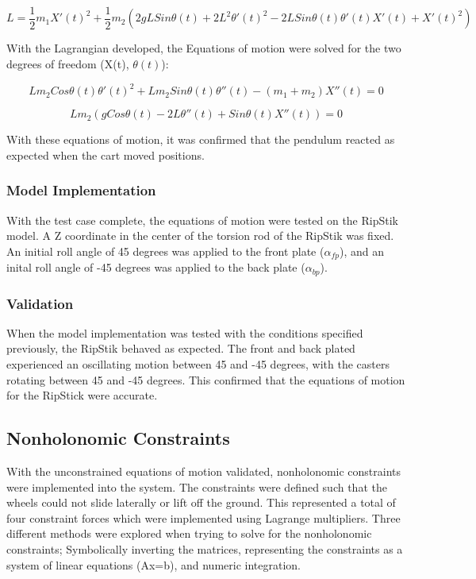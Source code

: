 \documentclass[12pt,letterpaper]{article}
\begin{document}
\begin{equation}
\label{eq:CartLagrange}
L = \frac{1}{2}m_{1}X'(t)^2+\frac{1}{2}m_{2}(2gLSin\theta(t)+2L^2\theta'(t)^2-2LSin\theta(t)\theta'(t)X'(t)+X'(t)^2) 
\end{equation}

With the Lagrangian developed, the Equations of motion were solved for the two degrees of freedom (X(t), $\theta(t)$):

\begin{equation}
Lm_{2}Cos\theta(t)\theta'(t)^2+Lm_{2}Sin\theta(t)\theta''(t)-(m_{1}+m_{2})X''(t) = 0
\end{equation}

\begin{equation}
Lm_{2}(gCos\theta(t)-2L\theta''(t)+Sin\theta(t)X''(t)) = 0
\end{equation}

With these equations of motion, it was confirmed that the pendulum reacted as expected when the cart moved positions.

\subsubsection{Model Implementation}
With the test case complete, the equations of motion were tested on the RipStik model. A Z coordinate in the center of the torsion rod of the RipStik was fixed.
An initial roll angle of 45 degrees was applied to the front plate ($\alpha_{fp}$), and an inital roll angle of -45 degrees was applied to the back plate ($\alpha_{bp}$). 

\subsubsection{Validation}
When the model implementation was tested with the conditions specified previously, the RipStik behaved as expected. 
The front and back plated experienced an oscillating motion between 45 and -45 degrees, with the casters rotating between 45 and -45 degrees. 
This confirmed that the equations of motion for the RipStick were accurate.

\subsection{Nonholonomic Constraints}
With the unconstrained equations of motion validated, nonholonomic constraints were implemented into the system. 
The constraints were defined such that the wheels could not slide laterally or lift off the ground. 
This represented a total of four constraint forces which were implemented using Lagrange multipliers.
Three different methods were explored when trying to solve for the nonholonomic constraints; Symbolically inverting the matrices, representing the constraints as a system of linear equations (Ax=b), and numeric integration.
\end{document}
